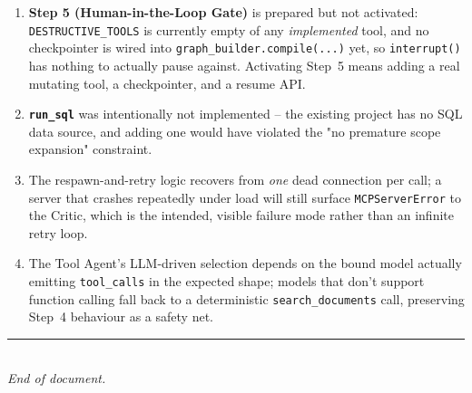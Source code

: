 \documentclass[11pt,a4paper]{article}
\begin{document}
\begin{enumerate}
\item \textbf{Step 5 (Human-in-the-Loop Gate)} is prepared but not
      activated: \texttt{DESTRUCTIVE\_TOOLS} is currently empty of any
      \emph{implemented} tool, and no checkpointer is wired into
      \texttt{graph\_builder.compile(...)} yet, so \texttt{interrupt()}
      has nothing to actually pause against. Activating Step~5 means
      adding a real mutating tool, a checkpointer, and a resume API.
\item \textbf{\texttt{run\_sql}} was intentionally not implemented -- the
      existing project has no SQL data source, and adding one would have
      violated the "no premature scope expansion" constraint.
\item The respawn-and-retry logic recovers from \emph{one} dead
      connection per call; a server that crashes repeatedly under load
      will still surface \texttt{MCPServerError} to the Critic, which is
      the intended, visible failure mode rather than an infinite retry
      loop.
\item The Tool Agent's LLM-driven selection depends on the bound model
      actually emitting \texttt{tool\_calls} in the expected shape; models
      that don't support function calling fall back to a deterministic
      \texttt{search\_documents} call, preserving Step~4 behaviour as a
      safety net.
\end{enumerate}

\vspace{1cm}
\begin{center}
\textcolor{navy!60}{\rule{0.4\textwidth}{0.6pt}}\\[4pt]
{\small\itshape End of document.}
\end{center}
\end{document}
